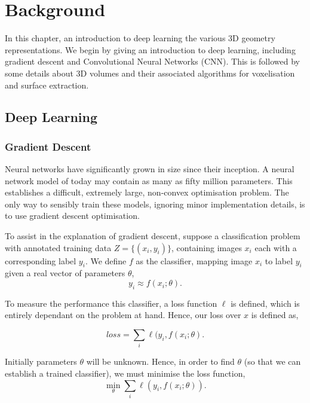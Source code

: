 \chapter{Background}
\label{chapter:background}

In this chapter, an introduction to deep learning the various 3D
geometry representations.  We begin by giving an introduction to
deep learning, including gradient descent and Convolutional Neural
Networks (CNN). This is followed by some details about 3D volumes and
their associated algorithms for voxelisation and surface extraction.


\section{Deep Learning}
\label{sec:background:nn}


\subsection{Gradient Descent}

Neural networks have significantly grown in size since their
inception. A neural network model of today may contain as many as
fifty million parameters. This establishes a difficult, extremely
large, non-convex optimisation problem. The only way to sensibly train
these models, ignoring minor implementation details, is to use
gradient descent optimisation.


To assist in the explanation of gradient descent, suppose a
classification problem with annotated training data
$Z = \{(x_i, y_i)\}$, containing images $x_i$ each with a
corresponding label $y_i$. We define $f$ as the classifier, mapping
image $x_i$ to label $y_i$ given a real vector of parameters $\theta$,
\begin{equation}
  y_i \approx f(x_i;\theta) .
\end{equation}

\noindent To measure the performance this classifier, a loss function
$\ell$ is defined, which is entirely dependant on the problem at
hand. Hence, our loss over $x$ is defined as,

\begin{equation}
  loss = \sum_i \ell(y_i, f(x_i ; \theta) .
\end{equation}


\noindent Initially parameters $\theta$ will be unknown. Hence, in
order to find $\theta$ (so that we can establish a trained
classifier), we must minimise the loss function,
\begin{equation}
  \min_\theta \sum_i \ell(y_i, f(x_i ; \theta)) .
\end{equation}



